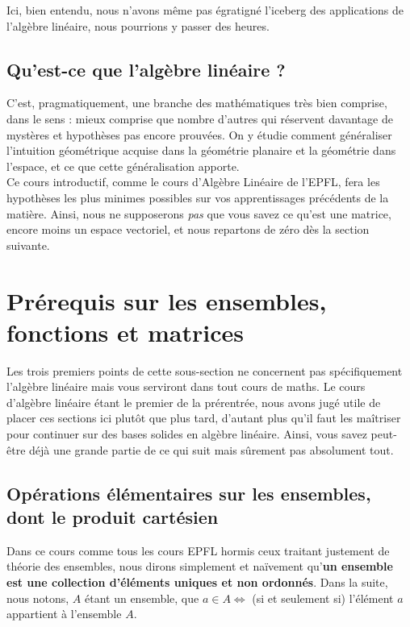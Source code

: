 \documentclass{article}
\begin{document}
\noindent Ici, bien entendu, nous n'avons même pas égratigné l'iceberg des applications de l'algèbre linéaire, nous pourrions y passer des heures.

\subsection{Qu'est-ce que l'algèbre linéaire ?}
C'est, pragmatiquement, une branche des mathématiques très bien comprise, dans le sens : mieux comprise que nombre d'autres qui réservent davantage de mystères et hypothèses pas encore prouvées. On y étudie comment généraliser l'intuition géométrique acquise dans la géométrie planaire et la géométrie dans l'espace, et ce que cette généralisation apporte.\\

\noindent Ce cours introductif, comme le cours d'Algèbre Linéaire de l'EPFL, fera les hypothèses les plus minimes possibles sur vos apprentissages précédents de la matière. Ainsi, nous ne supposerons \textit{pas} que vous savez ce qu'est une matrice, encore moins un espace vectoriel, et nous repartons de zéro dès la section suivante.\\

\section{Prérequis sur les ensembles, fonctions et matrices}

Les trois premiers points de cette sous-section ne concernent pas spécifiquement l'algèbre linéaire mais vous serviront dans tout cours de maths. Le cours d'algèbre linéaire étant le premier de la prérentrée, nous avons jugé utile de placer ces sections ici plutôt que plus tard, d'autant plus qu'il faut les maîtriser pour continuer sur des bases solides en algèbre linéaire. Ainsi, vous savez peut-être déjà une grande partie de ce qui suit mais sûrement pas absolument tout.

\subsection{Opérations élémentaires sur les ensembles, dont le produit cartésien}
Dans ce cours comme tous les cours EPFL hormis ceux traitant justement de théorie des ensembles, nous dirons simplement et naïvement qu'\textbf{un ensemble est une collection d'éléments uniques et non ordonnés}. Dans la suite, nous notons, $A$ étant un ensemble, que $a \in A \iff$ (si et seulement si) l'élément $a$ appartient à l'ensemble $A$.\\
\end{document}
